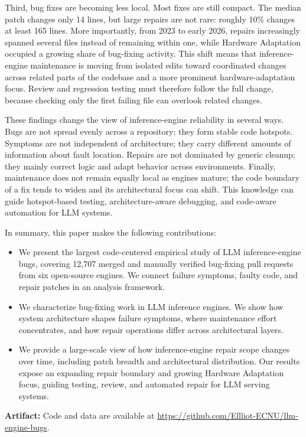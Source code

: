Third, bug fixes are becoming less local. Most fixes are still compact. The median patch changes only 14 lines, but large repairs are not rare: roughly 10\% changes at least 165 lines. More importantly, from 2023 to early 2026, repairs increasingly spanned several files instead of remaining within one, while Hardware Adaptation occupied a growing share of bug-fixing activity. This shift means that inference-engine maintenance is moving from isolated edits toward coordinated changes across related parts of the codebase and a more prominent hardware-adaptation focus. Review and regression testing must therefore follow the full change, because checking only the first failing file can overlook related changes.

These findings change the view of inference-engine reliability in several ways. Bugs are not spread evenly across a repository; they form stable code hotspots. Symptoms are not independent of architecture; they carry different amounts of information about fault location. Repairs are not dominated by generic cleanup; they mainly correct logic and adapt behavior across environments. Finally, maintenance does not remain equally local as engines mature; the code boundary of a fix tends to widen and its architectural focus can shift. This knowledge can guide hotspot-based testing, architecture-aware debugging, and code-aware automation for LLM systems.

In summary, this paper makes the following contributions:
\begin{itemize}
    \item We present the largest code-centered empirical study of LLM inference-engine bugs, covering 12,707 merged and manually verified bug-fixing pull requests from six open-source engines. We connect failure symptoms, faulty code, and repair patches in an analysis framework.
    \item We characterize bug-fixing work in LLM inference engines. We show how system architecture shapes failure symptoms, where maintenance effort concentrates, and how repair operations differ across architectural layers.
    \item We provide a large-scale view of how inference-engine repair scope changes over time, including patch breadth and architectural distribution. Our results expose an expanding repair boundary and growing Hardware Adaptation focus, guiding testing, review, and automated repair for LLM serving systems.
\end{itemize}

\begin{tcolorbox}[
    colback=white,
    colframe=black,
    boxrule=0.5pt,
    arc=1pt,
    left=4pt,
    right=4pt,
    top=3pt,
    bottom=3pt,
    before skip=4pt,
    after skip=0pt
]
\textbf{Artifact:} Code and data are available at \url{https://github.com/Ellliot-ECNU/llm-engine-bugs}.
\end{tcolorbox}
